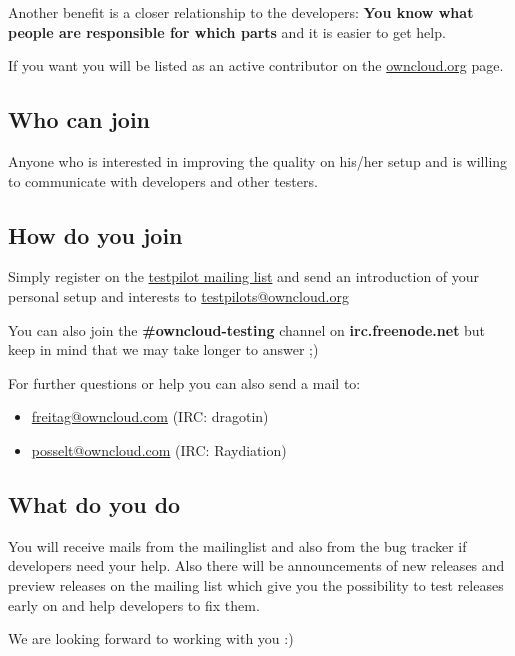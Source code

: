 \documentclass[letterpaper,10pt,english]{sphinxmanual}
\begin{document}
Another benefit is a closer relationship to the developers: \textbf{You know what people are responsible for which parts} and it is easier to get help.

If you want you will be listed as an active contributor on the \href{https://owncloud.org}{owncloud.org} page.


\subsection{Who can join}
\label{testing/index:who-can-join}
Anyone who is interested in improving the quality on his/her setup and is willing to communicate with developers and other testers.


\subsection{How do you join}
\label{testing/index:how-do-you-join}
Simply register on the \href{https://mailman.owncloud.org/mailman/listinfo/testpilots}{testpilot mailing list} and send an introduction of your personal setup and interests to \href{mailto:testpilots@owncloud.org}{testpilots@owncloud.org}

You can also join the \textbf{\#owncloud-testing} channel on \textbf{irc.freenode.net} but keep in mind that we may take longer to answer ;)

For further questions or help you can also send a mail to:
\begin{itemize}
\item {} 
\href{mailto:freitag@owncloud.com}{freitag@owncloud.com} (IRC: dragotin)

\item {} 
\href{mailto:posselt@owncloud.com}{posselt@owncloud.com} (IRC: Raydiation)

\end{itemize}


\subsection{What do you do}
\label{testing/index:what-do-you-do}
You will receive mails from the mailinglist and also from the bug tracker if developers need your help. Also there will be announcements of new releases and preview releases on the mailing list which give you the possibility to test releases early on and help developers to fix them.

We are looking forward to working with you :)
\end{document}
